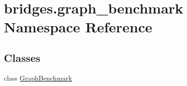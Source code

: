 \hypertarget{namespacebridges_1_1graph__benchmark}{}\section{bridges.\+graph\+\_\+benchmark Namespace Reference}
\label{namespacebridges_1_1graph__benchmark}
\subsection*{Classes}
\begin{DoxyCompactItemize}
\item 
class \hyperlink{classbridges_1_1graph__benchmark_1_1_graph_benchmark}{Graph\+Benchmark}
\end{DoxyCompactItemize}
